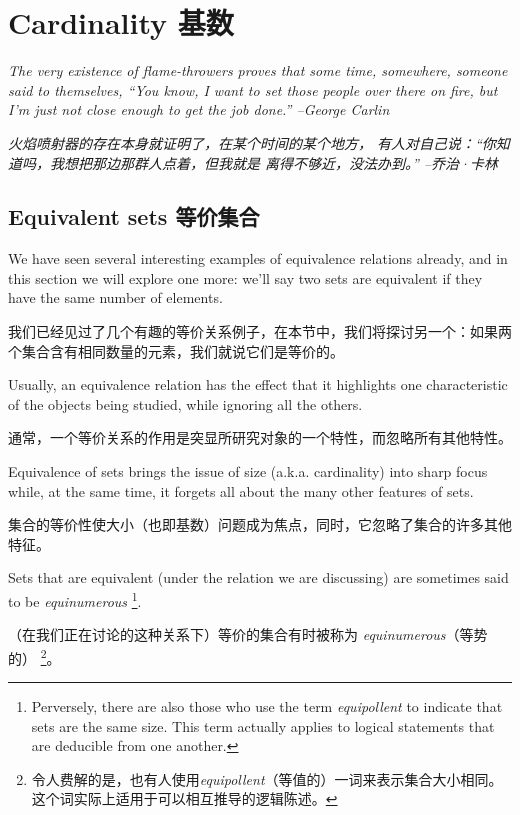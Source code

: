 \chapter{Cardinality 基数}
\label{ch:card}

{\em The very existence of flame-throwers proves that some time,
    somewhere, someone said to themselves, ``You know, I want to set
    those people over there on fire, but I'm just not close enough
    to get the job done.'' --George Carlin}

{\em 火焰喷射器的存在本身就证明了，在某个时间的某个地方，
    有人对自己说：“你知道吗，我想把那边那群人点着，但我就是
    离得不够近，没法办到。” --乔治·卡林}

\section{Equivalent sets 等价集合}
\label{sec:equiv_sets}

We have seen several interesting examples of equivalence relations
already, and in this section we will explore one more: we'll say two sets are equivalent
if they have the same number of elements.

我们已经见过了几个有趣的等价关系例子，在本节中，我们将探讨另一个：如果两个集合含有相同数量的元素，我们就说它们是等价的。

Usually, an equivalence relation
has the effect that it highlights one characteristic of the objects being studied,
while ignoring all the others.

通常，一个等价关系的作用是突显所研究对象的一个特性，而忽略所有其他特性。

Equivalence of sets brings the issue of size (a.k.a.
cardinality) into sharp focus while, at the same time, it forgets all about the
many other features of sets.

集合的等价性使大小（也即基数）问题成为焦点，同时，它忽略了集合的许多其他特征。

Sets that are equivalent (under the relation we
are discussing) are sometimes said to be 
\emph{equinumerous}
\footnote{Perversely, there are also those who use the term \emph{equipollent}
    to indicate that sets are the same size.
    This term actually applies to
    logical statements that are deducible from one another.}.

（在我们正在讨论的这种关系下）等价的集合有时被称为
\emph{equinumerous}（等势的）
\footnote{令人费解的是，也有人使用\emph{equipollent}（等值的）一词来表示集合大小相同。
    这个词实际上适用于可以相互推导的逻辑陈述。}。

